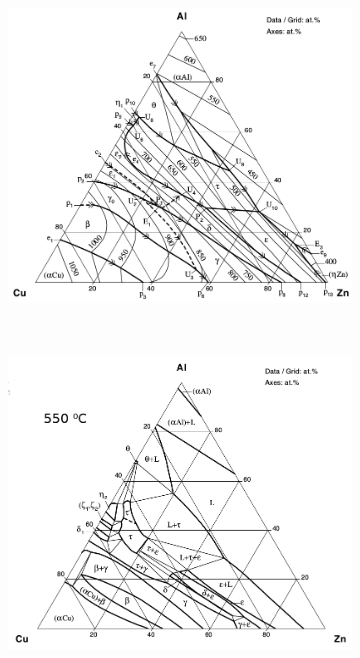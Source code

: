 \documentclass[a4paper,12pt,fleqn,twoside,openany]{book}
\begin{document}
  \begin{figure}
    \centering
    \begin{subfigure}{0.4\textwidth}
        \includegraphics[width=\textwidth]{Img/Introduccion/IsotermaLiq.png}
    \end{subfigure}
    ~ %
    \begin{subfigure}{0.4\textwidth}
        \includegraphics[width=\textwidth]{Img/Introduccion/Isoterma550.png}

\end{subfigure}
\end{figure}
\end{document}
